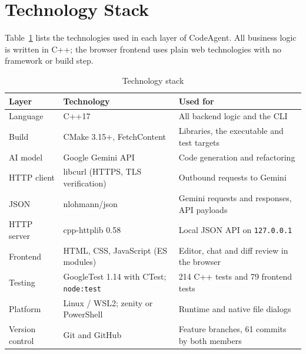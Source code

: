 \documentclass[12pt,a4paper,oneside]{book}
\begin{document}
\section{Technology Stack}
\label{sec:ca-tech}

Table~\ref{tab:ca-tech} lists the technologies used in each layer of
CodeAgent. All business logic is written in C++; the browser frontend uses
plain web technologies with no framework or build step.

\begin{table}[htbp]
\centering\small
\begin{tabular}{|p{2.8cm}|p{5.2cm}|p{6.0cm}|}
\hline
\textbf{Layer} & \textbf{Technology} & \textbf{Used for} \\ \hline
Language & C++17 & All backend logic and the CLI \\ \hline
Build & CMake 3.15+, FetchContent & Libraries, the executable and test targets \\ \hline
AI model & Google Gemini API & Code generation and refactoring \\ \hline
HTTP client & libcurl (HTTPS, TLS verification) & Outbound requests to Gemini \\ \hline
JSON & nlohmann/json & Gemini requests and responses, API payloads \\ \hline
HTTP server & cpp-httplib 0.58 & Local JSON API on \texttt{127.0.0.1} \\ \hline
Frontend & HTML, CSS, JavaScript (ES modules) & Editor, chat and diff review in the browser \\ \hline
Testing & GoogleTest 1.14 with CTest; \texttt{node:test} & 214 C++ tests and 79 frontend tests \\ \hline
Platform & Linux / WSL2; zenity or PowerShell & Runtime and native file dialogs \\ \hline
Version control & Git and GitHub & Feature branches, 61 commits by both members \\ \hline
\end{tabular}
\caption{Technology stack}
\label{tab:ca-tech}
\end{table}
\end{document}
